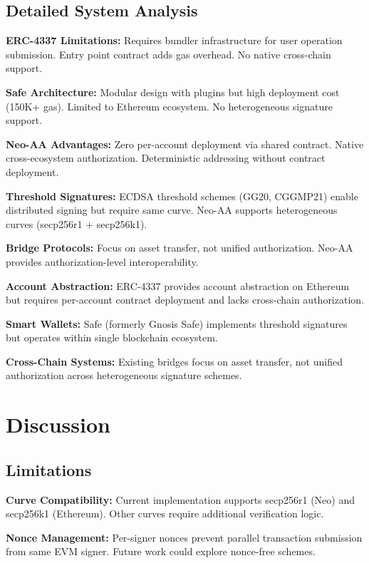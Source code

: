 \documentclass[10pt,twocolumn]{article}
\begin{document}
{\subsection{Detailed System Analysis}

\textbf{ERC-4337 Limitations:} Requires bundler infrastructure for user operation submission. Entry point contract adds gas overhead. No native cross-chain support.

\textbf{Safe Architecture:} Modular design with plugins but high deployment cost (150K+ gas). Limited to Ethereum ecosystem. No heterogeneous signature support.

\textbf{Neo-AA Advantages:} Zero per-account deployment via shared contract. Native cross-ecosystem authorization. Deterministic addressing without contract deployment.


\textbf{Threshold Signatures:} ECDSA threshold schemes (GG20, CGGMP21) enable distributed signing but require same curve. Neo-AA supports heterogeneous curves (secp256r1 + secp256k1).

\textbf{Bridge Protocols:} Focus on asset transfer, not unified authorization. Neo-AA provides authorization-level interoperability.


\textbf{Account Abstraction:} ERC-4337 provides account abstraction on Ethereum but requires per-account contract deployment and lacks cross-chain authorization.

\textbf{Smart Wallets:} Safe (formerly Gnosis Safe) implements threshold signatures but operates within single blockchain ecosystem.

\textbf{Cross-Chain Systems:} Existing bridges focus on asset transfer, not unified authorization across heterogeneous signature schemes.


\section{Discussion}

\subsection{Limitations}

\textbf{Curve Compatibility:} Current implementation supports secp256r1 (Neo) and secp256k1 (Ethereum). Other curves require additional verification logic.

\textbf{Nonce Management:} Per-signer nonces prevent parallel transaction submission from same EVM signer. Future work could explore nonce-free schemes.

}
\end{document}
